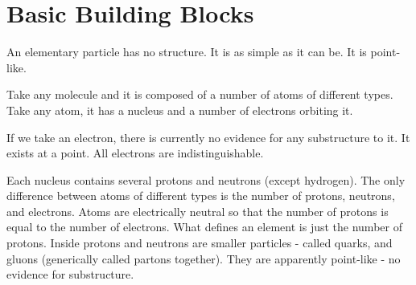 \documentclass[10pt,a4paper]{article}
\begin{document}
\section*{Basic Building Blocks}

An elementary particle has no structure. It is as simple as it can be. It is point-like.

Take any molecule and it is composed of a number of atoms of different types. Take any atom, it has a nucleus and a number of electrons orbiting it.

If we take an electron, there is currently no evidence for any substructure to it. It exists at a point. All electrons are indistinguishable.

Each nucleus contains several protons and neutrons (except hydrogen). The only difference between atoms of different types is the number of protons, neutrons, and electrons. Atoms are electrically neutral so that the number of protons is equal to the number of electrons. What defines an element is just the number of protons. Inside protons and neutrons are smaller particles - called quarks, and gluons (generically called partons together). They are apparently point-like - no evidence for substructure.
\end{document}
